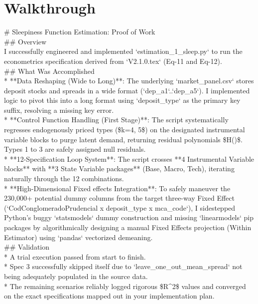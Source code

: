 \documentclass{article}
\begin{document}
\newpage
\section*{Walkthrough}
\# Sleepiness Function Estimation: Proof of Work \\



\#\# Overview \\
I successfully engineered and implemented `estimation\_1\_sleep.py` to run the econometrics specification derived from `V2.1.0.tex` (Eq-11 and Eq-12). \\



\#\# What Was Accomplished \\
* **Data Reshaping (Wide to Long)**: The underlying `market\_panel.csv` stores deposit stocks and spreads in a wide format (`dep\_a1`..`dep\_a5`). I implemented logic to pivot this into a long format using `deposit\_type` as the primary key suffix, resolving a missing key error. \\
* **Control Function Handling (First Stage)**: The script systematically regresses endogenously priced types (\$k=4, 5\$) on the designated instrumental variable blocks to purge latent demand, returning residual polynomials \$H(\hat{\nu})\$. Types 1 to 3 are safely assigned null residuals.  \\
* **12-Specification Loop System**: The script crosses **4 Instrumental Variable blocks** with **3 State Variable packages** (Base, Macro, Tech), iterating naturally through the 12 combinations. \\
* **High-Dimensional Fixed effects Integration**: To safely maneuver the 230,000+ potential dummy columns from the target three-way Fixed Effect (`CodConglomeradoPrudencial x deposit\_type x mca\_code`), I sidestepped Python's buggy `statsmodels` dummy construction and missing `linearmodels` pip packages by algorithmically designing a manual Fixed Effects projection (Within Estimator) using `pandas` vectorized demeaning.  \\



\#\# Validation \\
* A trial execution passed from start to finish.  \\
* Spec 3 successfully skipped itself due to `leave\_one\_out\_mean\_spread` not being adequately populated in the source data. \\
* The remaining scenarios reliably logged rigorous \$R^2\$ values and converged on the exact specifications mapped out in your implementation plan. \\
\end{document}
